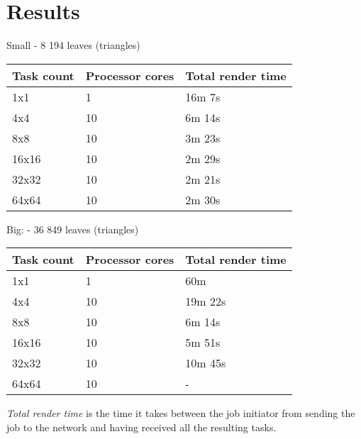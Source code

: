 \chapter{Results}

\begin{center}
    Small - 8 194 leaves (triangles)
    \begin{tabular}{ | l | l | l |} \hline
    Task count & Processor cores & Total render time \\ \hline
    1x1 & 1 & 16m 7s\\ \hline
    4x4 & 10 & 6m 14s \\ \hline
    8x8 & 10 & 3m 23s \\ \hline
    16x16 & 10 & 2m 29s \\ \hline
    32x32 & 10 & 2m 21s \\ \hline
    64x64 & 10 & 2m 30s \\ \hline
    \end{tabular}
    
    Big:    - 36 849 leaves (triangles)
    \begin{tabular}{ | l | l | l |} \hline
    Task count & Processor cores & Total render time \\ \hline
    1x1 & 1 & 60m\\ \hline
    4x4 & 10 & 19m 22s \\ \hline
    8x8 & 10 & 6m 14s \\ \hline
    16x16 & 10 & 5m 51s \\ \hline
    32x32 & 10 & 10m 45s \\ \hline
    64x64 & 10 & - \\ \hline
    \end{tabular}
    
    
    \emph{Total render time} is the time it takes between the job initiator from sending the job to the network and having received all the resulting tasks.
\end{center}

